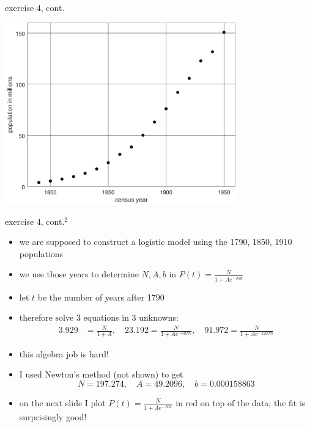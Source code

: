 \documentclass{beamer}
\begin{document}
\begin{frame}{exercise 4, cont.}

\begin{center}
\includegraphics[width=0.75\textwidth]{figs/plotcensus}
\end{center}
\end{frame}


\begin{frame}{exercise 4, cont.$^2$}

\begin{itemize}
\item we are supposed to construct a logistic model using the 1790, 1850, 1910 populations
\item we use those years to determine $N,A,b$ in $P(t) = \frac{N}{1 + A e^{-Nbt}}$
\item let $t$ be the number of years after 1790
\item therefore solve 3 equations in 3 unknowns:
\small
\begin{align*}
3.929 &= \frac{N}{1 + A}, \quad 23.192 = \frac{N}{1 + A e^{-60 Nb}}, \quad 91.972 = \frac{N}{1 + A e^{-120 Nb}}
\end{align*}
\normalsize
\item this algebra job is hard!
\item I used Newton's method (not shown) to get
    $$N=197.274, \quad A=49.2096, \quad b=0.000158863$$
\item on the next slide I plot $P(t) = \frac{N}{1 + A e^{-Nbt}}$ in red on top of the data; the fit is surprisingly good!
\end{itemize}
\end{frame}
\end{document}
